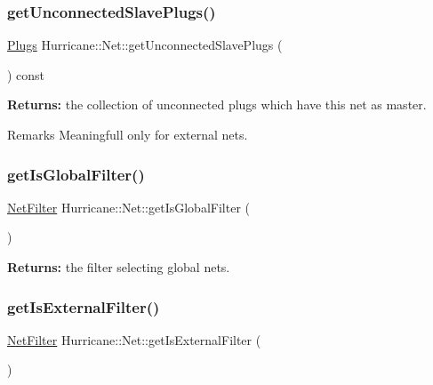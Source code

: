 \subsubsection{\texorpdfstring{get\+Unconnected\+Slave\+Plugs()}{getUnconnectedSlavePlugs()}}
{\footnotesize\ttfamily \mbox{\hyperlink{namespaceHurricane_ac8335d2057483ee7a935c15a9460c64f}{Plugs}} Hurricane\+::\+Net\+::get\+Unconnected\+Slave\+Plugs (\begin{DoxyParamCaption}{ }\end{DoxyParamCaption}) const}

{\bfseries Returns\+:} the collection of unconnected plugs which have this net as master.

\begin{DoxyRemark}{Remarks}
Meaningfull only for external nets. 
\end{DoxyRemark}
\mbox{\label{classHurricane_1_1Net_a1730ed1247cd9bce7fcf519ea60dc738}} 
\subsubsection{\texorpdfstring{get\+Is\+Global\+Filter()}{getIsGlobalFilter()}}
{\footnotesize\ttfamily \mbox{\hyperlink{namespaceHurricane_a0dfd2c5b40325a919d139091312732e9}{Net\+Filter}} Hurricane\+::\+Net\+::get\+Is\+Global\+Filter (\begin{DoxyParamCaption}{ }\end{DoxyParamCaption})\hspace{0.3cm}{\ttfamily [static]}}

{\bfseries Returns\+:} the filter selecting global nets. \mbox{\label{classHurricane_1_1Net_a3af91a80e219e37e70229e61dfd385da}} 
\subsubsection{\texorpdfstring{get\+Is\+External\+Filter()}{getIsExternalFilter()}}
{\footnotesize\ttfamily \mbox{\hyperlink{namespaceHurricane_a0dfd2c5b40325a919d139091312732e9}{Net\+Filter}} Hurricane\+::\+Net\+::get\+Is\+External\+Filter (\begin{DoxyParamCaption}{ }\end{DoxyParamCaption})\hspace{0.3cm}{\ttfamily [static]}}

